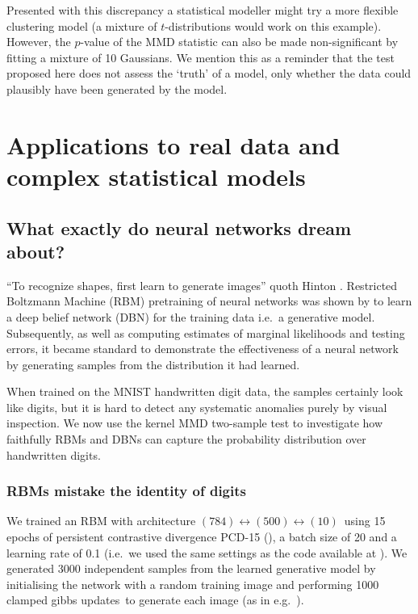 \documentclass{article} %
\def\ie{i.e.\ }
\def\eg{e.g.\ }
\begin{document}
Presented with this discrepancy a statistical modeller might try a more flexible clustering model \citep{Peel2000-pv, Iwata2012-yj} (a mixture of $t$-distributions would work on this example).
However, the $p$-value of the MMD statistic can also be made non-significant by fitting a mixture of 10 Gaussians.
We mention this as a reminder that the test proposed here does not assess the `truth' of a model, only whether the data could plausibly have been generated by the model.

\section{Applications to real data and complex statistical models}

\subsection{What exactly do neural networks dream about?}

``To recognize shapes, first learn to generate images'' quoth Hinton \citep{Hinton2007-eo}.
Restricted Boltzmann Machine (RBM) pretraining of neural networks was shown by \cite{Hinton2006-yw} to learn a deep belief network (DBN) for the training data \ie a generative model.
Subsequently, as well as computing estimates of marginal likelihoods and testing errors, it became standard to demonstrate the effectiveness of a neural network by generating samples from the distribution it had learned.

When trained on the MNIST handwritten digit data, the samples certainly look like digits, but it is hard to detect any systematic anomalies purely by visual inspection.
We now use the kernel MMD two-sample test to investigate how faithfully RBMs and DBNs can capture the probability distribution over handwritten digits.

\subsubsection{RBMs mistake the identity of digits}

We trained an RBM with architecture $(784)\leftrightarrow(500)\leftrightarrow(10)$\footnotemark~using 15 epochs of persistent contrastive divergence PCD-15 (), a batch size of 20 and a learning rate of 0.1 (\ie we used the same settings as the code available at ).
We generated 3000 independent samples from the learned generative model by initialising the network with a random training image and performing 1000 clamped gibbs updates\footnotemark~to generate each image (as in \eg \cite{Hinton2007-eo}).
\end{document}
